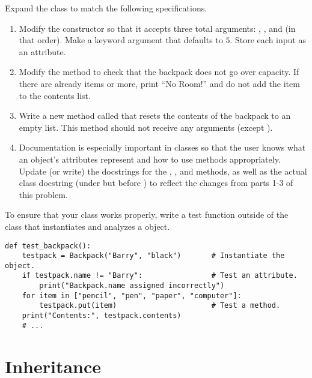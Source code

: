 \begin{problem} %
Expand the  class to match the following specifications.
\begin{enumerate}
\item Modify the constructor so that it accepts three total arguments: , , and  (in that order).
Make  a keyword argument that defaults to $5$.
Store each input as an attribute.

\item Modify the  method to check that the backpack does not go over capacity.
If there are already  items or more, print ``No Room!'' and do not add the item to the contents list.

\item Write a new method called  that resets the contents of the backpack to an empty list.
This method should not receive any arguments (except ).

\item Documentation is especially important in classes so that the user knows what an object's attributes represent and how to use methods appropriately.
Update (or write) the docstrings for the , , and  methods, as well as the actual class docstring (under  but before ) to reflect the changes from parts 1-3 of this problem.
\end{enumerate}

To ensure that your class works properly, write a test function outside of the  class that instantiates and analyzes a  object.
\begin{lstlisting}
def test_backpack():
    testpack = Backpack("Barry", "black")       # Instantiate the object.
    if testpack.name != "Barry":                # Test an attribute.
        print("Backpack.name assigned incorrectly")
    for item in ["pencil", "pen", "paper", "computer"]:
        testpack.put(item)                      # Test a method.
    print("Contents:", testpack.contents)
    # ...
\end{lstlisting}
\end{problem}

\section*{Inheritance} %

